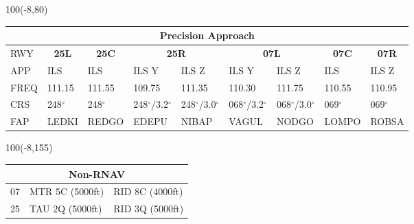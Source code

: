 \documentclass[10pt,landscape,a4paper]{article}
\begin{document}
\begin{textblock}{100}(-8,80)
\begin{table}[]
\begin{tabular}{|l|l|l|l|l|l|l|l|l|}
\multicolumn{9}{c}{\textbf{Precision Approach}}                                                                                                                                                                            \\ \hline
RWY  & \multicolumn{1}{c|}{\textbf{25L}} & \multicolumn{1}{c|}{\textbf{25C}} & \multicolumn{2}{c|}{\textbf{25R}} & \multicolumn{2}{c|}{\textbf{07L}} & \multicolumn{1}{c|}{\textbf{07C}} & \multicolumn{1}{c|}{\textbf{07R}} \\ \hline
APP  & ILS                               & ILS                               & ILS Y           & ILS Z           & ILS Y           & ILS Z           & ILS                               & ILS Z                             \\
FREQ & 111.15                            & 111.55                            & 109.75          & 111.35          & 110.30          & 111.75          & 110.55                            & 110.95                            \\
CRS  & 248$^\circ$                              & 248$^\circ$                              & 248$^\circ$/3.2$^\circ$       & 248$^\circ$/3.0$^\circ$       & 068$^\circ$/3.2$^\circ$       & 068$^\circ$/3.0$^\circ$       & 069$^\circ$                              & 069$^\circ$                              \\
FAP  & LEDKI                             & REDGO                             & EDEPU           & NIBAP           & VAGUL           & NODGO           & LOMPO                             & ROBSA                             \\ \hline
\end{tabular}
\end{table}
\end{textblock}



\begin{textblock}{100}(-8,155)
\begin{table}[]
\begin{tabular}{|l|l|l|}
\multicolumn{3}{c}{\textbf{Non-RNAV}} \\ \hline
07  & MTR 5C (5000ft)    & RID 8C (4000ft)   \\ \hline
25  & TAU 2Q (5000ft)    & RID 3Q (5000ft)   \\ \hline
\end{tabular}
\end{table}
\end{textblock}
\end{document}
